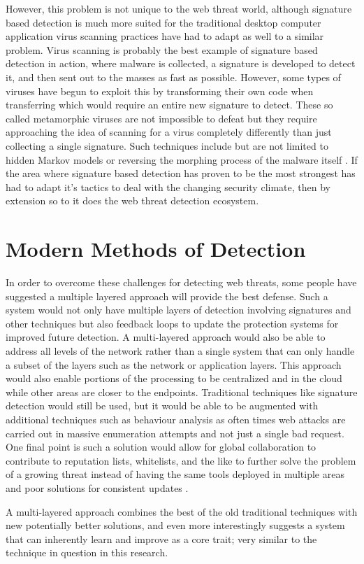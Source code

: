 However, this problem is not unique to the web threat world, although signature based detection is much more suited for the traditional desktop computer application virus scanning practices have had to adapt as well to a similar problem.  Virus scanning is probably the best example of signature based detection in action, where malware is collected, a signature is developed to detect it, and then sent out to the masses as fast as possible.  However, some types of viruses have begun to exploit this by transforming their own code when transferring which would require an entire new signature to detect.  These so called metamorphic viruses are not impossible to defeat but they require approaching the idea of scanning for a virus completely differently than just collecting a single signature.  Such techniques include but are not limited to hidden Markov models or reversing the morphing process of the malware itself \cite{metaInvincible}\cite{metaHunting}.  If the area where signature based detection has proven to be the most strongest has had to adapt it's tactics to deal with the changing security climate, then by extension so to it does the web threat detection ecosystem.

\section{Modern Methods of Detection}

In order to overcome these challenges for detecting web threats, some people have suggested a multiple layered approach will provide the best defense.  Such a system would not only have multiple layers of detection involving signatures and other techniques but also feedback loops to update the protection systems for improved future detection.  A multi-layered approach would also be able to address all levels of the network rather than a single system that can only handle a subset of the layers such as the network or application layers.  This approach would also enable portions of the processing to be centralized and in the cloud while other areas are closer to the endpoints.  Traditional techniques like signature detection would still be used, but it would be able to be augmented with additional techniques such as behaviour analysis as often times web attacks are carried out in massive enumeration attempts and not just a single bad request.  One final point is such a solution would allow for global collaboration to contribute to reputation lists, whitelists, and the like to further solve the problem of a growing threat instead of having the same tools deployed in multiple areas and poor solutions for consistent updates \cite{trendMicro}.

A multi-layered approach combines the best of the old traditional techniques with new potentially better solutions, and even more interestingly suggests a system that can inherently learn and improve as a core trait; very similar to the technique in question in this research.








